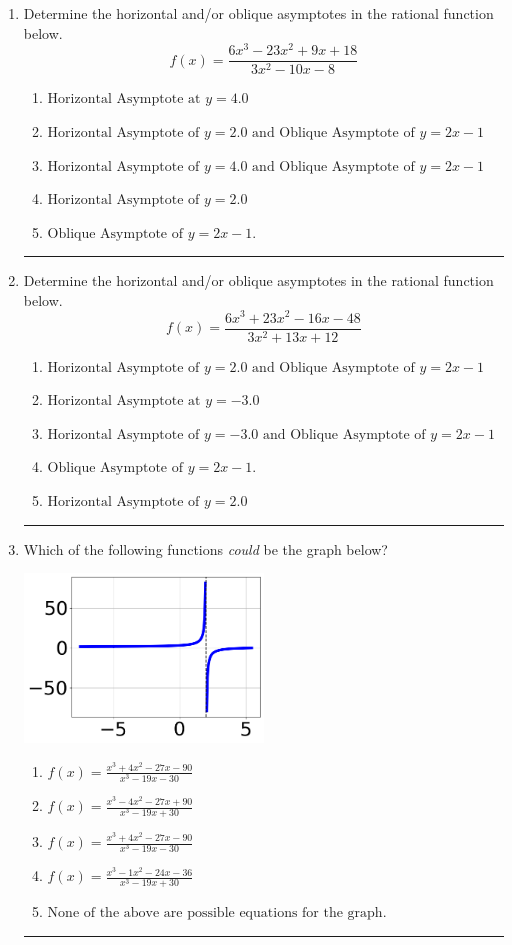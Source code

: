 \documentclass[14pt]{extbook}
\newcommand{\litem}[1]{\item#1\hspace*{-1cm}\rule{\textwidth}{0.4pt}}
\begin{document}
\begin{enumerate}
\litem{
Determine the horizontal and/or oblique asymptotes in the rational function below.\[ f(x) = \frac{6x^{3} -23 x^{2} +9 x + 18}{3x^{2} -10 x -8} \]\begin{enumerate}[label=\Alph*.]
\item \( \text{Horizontal Asymptote at } y = 4.0 \)
\item \( \text{Horizontal Asymptote of } y = 2.0 \text{ and Oblique Asymptote of } y = 2x -1 \)
\item \( \text{Horizontal Asymptote of } y = 4.0 \text{ and Oblique Asymptote of } y = 2x -1 \)
\item \( \text{Horizontal Asymptote of } y = 2.0  \)
\item \( \text{Oblique Asymptote of } y = 2x -1. \)

\end{enumerate} }
\litem{
Determine the horizontal and/or oblique asymptotes in the rational function below.\[ f(x) = \frac{6x^{3} +23 x^{2} -16 x -48}{3x^{2} +13 x + 12} \]\begin{enumerate}[label=\Alph*.]
\item \( \text{Horizontal Asymptote of } y = 2.0 \text{ and Oblique Asymptote of } y = 2x -1 \)
\item \( \text{Horizontal Asymptote at } y = -3.0 \)
\item \( \text{Horizontal Asymptote of } y = -3.0 \text{ and Oblique Asymptote of } y = 2x -1 \)
\item \( \text{Oblique Asymptote of } y = 2x -1. \)
\item \( \text{Horizontal Asymptote of } y = 2.0  \)

\end{enumerate} }
\litem{
Which of the following functions \textit{could} be the graph below?
\begin{center}
    \includegraphics[width=0.5\textwidth]{../Figures/identifyGraphOfRationalFunctionA.png}
\end{center}
\begin{enumerate}[label=\Alph*.]
\item \( f(x)=\frac{x^{3} +4 x^{2} -27 x -90}{x^{3} -19 x -30} \)
\item \( f(x)=\frac{x^{3} -4 x^{2} -27 x + 90}{x^{3} -19 x + 30} \)
\item \( f(x)=\frac{x^{3} +4 x^{2} -27 x -90}{x^{3} -19 x -30} \)
\item \( f(x)=\frac{x^{3} -1 x^{2} -24 x -36}{x^{3} -19 x + 30} \)
\item \( \text{None of the above are possible equations for the graph.} \)


\end{enumerate}}
\end{enumerate}
\end{document}
